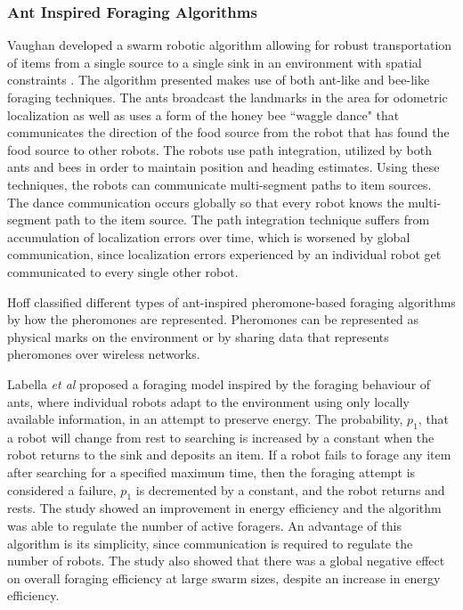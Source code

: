 \subsubsection{Ant Inspired Foraging Algorithms}
\label{sec:second:natureinspired:ant}

Vaughan developed a swarm robotic algorithm allowing for robust transportation of items from a single source to a single sink in an environment with spatial constraints \cite{vaughan2000blazing}. The algorithm presented makes use of both ant-like and bee-like foraging techniques. The ants broadcast the landmarks in the area for odometric localization as well as uses a form of the  honey bee ``waggle dance" that communicates the direction of the food source from the robot that has found the food source to other robots. The robots use path integration, utilized by both ants and bees in order to maintain position and heading estimates. Using these techniques, the robots can communicate multi-segment paths to item sources. The dance communication occurs globally so that every robot knows the multi-segment path to the item source. The path integration technique suffers from accumulation of localization errors over time, which is worsened by global communication, since localization errors experienced by an individual robot get communicated to every single other robot.


Hoff \cite{hoff2010two} classified different types of ant-inspired pheromone-based foraging algorithms by how the pheromones are represented. Pheromones can be represented as physical marks on the environment \cite{fujisawa2008communication} or by sharing data that represents pheromones over wireless networks.

Labella \textit{et al} \cite{labella2006division} proposed a foraging model inspired by the foraging behaviour of ants, where individual robots adapt to the environment using only locally available information, in an attempt to preserve energy. The probability, $p_1$, that a robot will change from rest to searching is increased by a constant when the robot returns to the sink and deposits an item. If a robot fails to forage any item after searching for a specified maximum time, then the foraging attempt is considered a failure, $p_1$ is decremented by a constant, and the robot returns and rests. The study showed an improvement in energy efficiency and the algorithm was able to regulate the number of active foragers. An advantage of this algorithm is its simplicity, since communication is required to regulate the number of robots. The study also showed that there was a global negative effect on overall foraging efficiency at large swarm sizes, despite an increase in energy efficiency.

